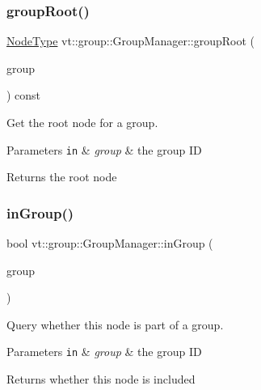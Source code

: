 \subsubsection{\texorpdfstring{group\+Root()}{groupRoot()}}
{\footnotesize\ttfamily \hyperlink{namespacevt_a866da9d0efc19c0a1ce79e9e492f47e2}{Node\+Type} vt\+::group\+::\+Group\+Manager\+::group\+Root (\begin{DoxyParamCaption}\item[{\hyperlink{namespacevt_a27b5e4411c9b6140c49100e050e2f743}{Group\+Type} const}]{group }\end{DoxyParamCaption}) const}



Get the root node for a group. 


\begin{DoxyParams}[1]{Parameters}
\mbox{\tt in}  & {\em group} & the group ID\\
\hline
\end{DoxyParams}
\begin{DoxyReturn}{Returns}
the root node 
\end{DoxyReturn}
\mbox{\label{structvt_1_1group_1_1_group_manager_a2204bcd119aaf06e0e356957faad36e6}} 
\subsubsection{\texorpdfstring{in\+Group()}{inGroup()}}
{\footnotesize\ttfamily bool vt\+::group\+::\+Group\+Manager\+::in\+Group (\begin{DoxyParamCaption}\item[{\hyperlink{namespacevt_a27b5e4411c9b6140c49100e050e2f743}{Group\+Type} const}]{group }\end{DoxyParamCaption})}



Query whether this node is part of a group. 


\begin{DoxyParams}[1]{Parameters}
\mbox{\tt in}  & {\em group} & the group ID\\
\hline
\end{DoxyParams}
\begin{DoxyReturn}{Returns}
whether this node is included 
\end{DoxyReturn}
\mbox{\label{structvt_1_1group_1_1_group_manager_ac9f99d33480a89a5863e59d0470faea2}} 
